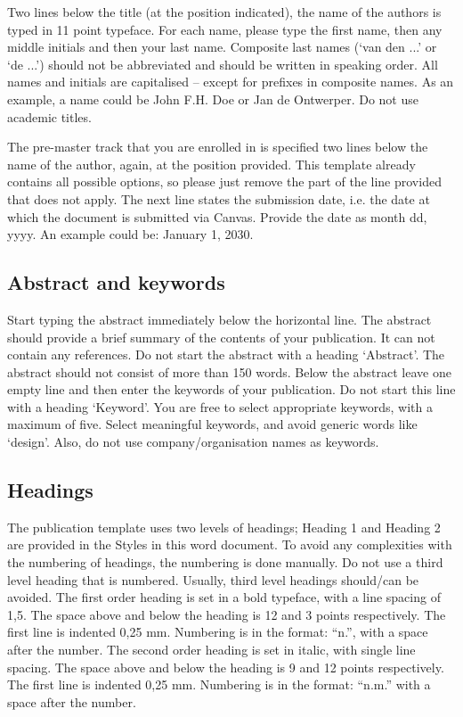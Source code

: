 \documentclass{paper}
\begin{document}
Two lines below the title (at the position indicated), the name of the authors is typed in 11 point typeface.
For each name, please type the first name, then any middle initials and then your last name.
Composite last names (‘van den ...’ or ‘de ...’) should not be abbreviated and should be written in speaking order.
All names and initials are capitalised – except for prefixes in composite names.
As an example, a name could be John F.H. Doe or Jan de Ontwerper.
Do not use academic titles.

The pre-master track that you are enrolled in is specified two lines below the name of the author, again, at the position provided.
This template already contains all possible options, so please just remove the part of the line provided that does not apply.
The next line states the submission date, i.e. the date at which the document is submitted via Canvas.
Provide the date as month dd, yyyy.
An example could be: January 1, 2030.

\subsection{Abstract and keywords}

Start typing the abstract immediately below the horizontal line.
The abstract should provide a brief summary of the contents of your publication.
It can not contain any references.
Do not start the abstract with a heading ‘Abstract’.
The abstract should not consist of more than 150 words.
Below the abstract leave one empty line and then enter the keywords of your publication.
Do not start this line with a heading ‘Keyword’.
You are free to select appropriate keywords, with a maximum of five.
Select meaningful keywords, and avoid generic words like ‘design’.
Also, do not use company/organisation names as keywords.

\subsection{Headings}

The publication template uses two levels of headings; Heading 1 and Heading 2 are provided in the Styles in this word document.
To avoid any complexities with the numbering of headings, the numbering is done manually.
Do not use a third level heading that is numbered.
Usually, third level headings should/can be avoided.
The first order heading is set in a bold typeface, with a line spacing of 1,5.
The space above and below the heading is 12 and 3 points respectively.
The first line is indented 0,25 mm.
Numbering is in the format: “n.”, with a space after the number.
The second order heading is set in italic, with single line spacing.
The space above and below the heading is 9 and 12 points respectively.
The first line is indented 0,25 mm.
Numbering is in the format: “n.m.” with a space after the number.

\cite{watanabe2019simd}

\printbibliography[heading=bibintoc]
\end{document}
